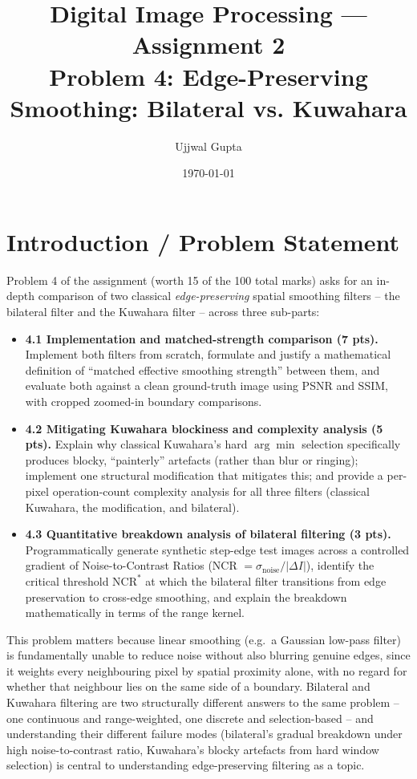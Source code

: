 \documentclass[11pt]{article}
\title{\textbf{Digital Image Processing --- Assignment 2}\\[0.3em]\large Problem 4: Edge-Preserving Smoothing: Bilateral vs. Kuwahara}
\author{Ujjwal Gupta}
\date{\today}
\begin{document}
\maketitle
\tableofcontents
\vspace{1em}

\section{Introduction / Problem Statement}

Problem 4 of the assignment (worth 15 of the 100 total marks) asks for an in-depth
comparison of two classical \emph{edge-preserving} spatial smoothing filters -- the
bilateral filter and the Kuwahara filter -- across three sub-parts:

\begin{itemize}[leftmargin=1.5em]
  \item \textbf{4.1 Implementation and matched-strength comparison (7 pts).}
  Implement both filters from scratch, formulate and justify a mathematical
  definition of ``matched effective smoothing strength'' between them, and evaluate
  both against a clean ground-truth image using PSNR and SSIM, with cropped
  zoomed-in boundary comparisons.
  \item \textbf{4.2 Mitigating Kuwahara blockiness and complexity analysis (5 pts).}
  Explain why classical Kuwahara's hard $\arg\min$ selection specifically produces
  blocky, ``painterly'' artefacts (rather than blur or ringing); implement one
  structural modification that mitigates this; and provide a per-pixel operation-count
  complexity analysis for all three filters (classical Kuwahara, the modification,
  and bilateral).
  \item \textbf{4.3 Quantitative breakdown analysis of bilateral filtering (3 pts).}
  Programmatically generate synthetic step-edge test images across a controlled
  gradient of Noise-to-Contrast Ratios (NCR $=\sigma_{\text{noise}}/|\Delta I|$),
  identify the critical threshold $\text{NCR}^*$ at which the bilateral filter
  transitions from edge preservation to cross-edge smoothing, and explain the
  breakdown mathematically in terms of the range kernel.
\end{itemize}

This problem matters because linear smoothing (e.g.\ a Gaussian low-pass filter) is
fundamentally unable to reduce noise without also blurring genuine edges, since it
weights every neighbouring pixel by spatial proximity alone, with no regard for
whether that neighbour lies on the same side of a boundary. Bilateral and Kuwahara
filtering are two structurally different answers to the same problem -- one continuous
and range-weighted, one discrete and selection-based -- and understanding their
different failure modes (bilateral's gradual breakdown under high noise-to-contrast
ratio, Kuwahara's blocky artefacts from hard window selection) is central to
understanding edge-preserving filtering as a topic.
\end{document}
